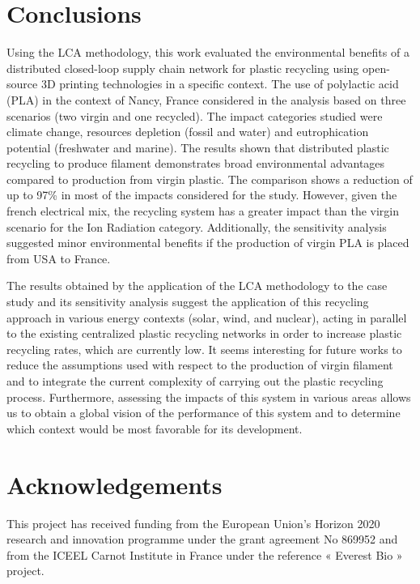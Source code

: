 \documentclass[12pt]{elsarticle} %
\begin{document}
\hypertarget{conclusions}{%
\section{Conclusions}\label{conclusions}}

Using the LCA methodology, this work evaluated the environmental benefits of a distributed closed-loop supply chain network for plastic recycling using open-source 3D printing technologies in a specific context.
The use of polylactic acid (PLA) in the context of Nancy, France considered in the analysis based on three scenarios (two virgin and one recycled).
The impact categories studied were climate change, resources depletion (fossil and water) and eutrophication potential (freshwater and marine).
The results shown that distributed plastic recycling to produce filament demonstrates broad environmental advantages compared to production from virgin plastic.
The comparison shows a reduction of up to 97\% in most of the impacts considered for the study.
However, given the french electrical mix, the recycling system has a greater impact than the virgin scenario for the Ion Radiation category.
Additionally, the sensitivity analysis suggested minor environmental benefits if the production of virgin PLA is placed from USA to France.

The results obtained by the application of the LCA methodology to the case study and its sensitivity analysis suggest the application of this recycling approach in various energy contexts (solar, wind, and nuclear), acting in parallel to the existing centralized plastic recycling networks in order to increase plastic recycling rates, which are currently low.
It seems interesting for future works to reduce the assumptions used with respect to the production of virgin filament and to integrate the current complexity of carrying out the plastic recycling process.
Furthermore, assessing the impacts of this system in various areas allows us to obtain a global vision of the performance of this system and to determine which context would be most favorable for its development.

\hypertarget{acknowledgements}{%
\section*{Acknowledgements}\label{acknowledgements}}

This project has received funding from the European Union's Horizon 2020 research and innovation programme under the grant agreement No 869952 and from the ICEEL Carnot Institute in France under the reference « Everest Bio » project.
\end{document}
